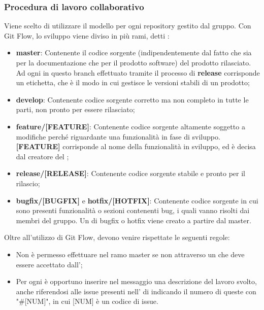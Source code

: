\subsubsection{Procedura di lavoro collaborativo}
Viene scelto di utilizzare il modello  per ogni repository gestito dal gruppo.
Con Git Flow, lo sviluppo viene diviso in più rami, detti :
\begin{itemize}
	\item \textbf{master}: Contenente il codice sorgente (indipendentemente dal fatto che sia per la documentazione che per il prodotto software) del prodotto rilasciato.
	Ad ogni  in questo branch effettuato tramite il processo di \textbf{release} corrisponde un etichetta, che è il modo in cui  gestisce le versioni stabili di un prodotto;
	\item \textbf{develop}: Contenente codice sorgente corretto ma non completo in tutte le parti, non pronto per essere rilasciato;
	\item \textbf{feature/[FEATURE]}: Contenente codice sorgente altamente soggetto a modifiche perché riguardante una funzionalità in fase di sviluppo.
	\textbf{[FEATURE]} corrisponde al nome della funzionalità in sviluppo, ed è decisa dal creatore del ;
	\item \textbf{release/[RELEASE]}: Contenente codice sorgente stabile e pronto per il rilascio;
	\item \textbf{bugfix/[BUGFIX]} e \textbf{hotfix/[HOTFIX]}: Contenente codice sorgente in cui sono presenti funzionalità o sezioni contenenti bug, i quali vanno risolti dai membri del gruppo.
	Un  di bugfix o hotfix viene creato a partire dal  master.
\end{itemize}

Oltre all'utilizzo di Git Flow, devono venire rispettate le seguenti regole:
\begin{itemize}
	\item Non è permesso effettuare  nel ramo master se non attraverso un  che deve essere accettato dall’\Amministratore{};
	\item Per ogni  è opportuno inserire nel messaggio una descrizione del lavoro svolto, anche riferendosi alle issue presenti nell' di  indicando il numero di queste con "\#[NUM]", in cui [NUM] è un codice di issue.
\end{itemize}
